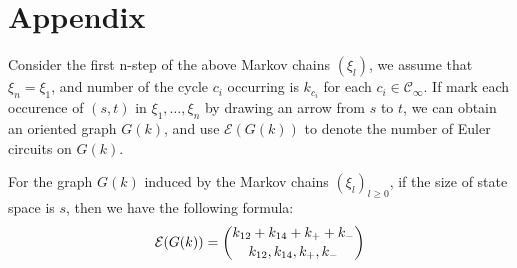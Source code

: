 \documentclass[11pt,en,cite=authoryear]{elegantpaper}
\begin{document}
\section{Appendix}
Consider the first n-step of the above Markov chains $(\xi_l)$, we assume that $\xi_{n}=\xi_1$, and number of the cycle $c_i$ occurring is $k_{c_i}$ for each $c_i \in \mathcal{C}_{\infty}$. 
If mark each occurence of $(s, t)$ in $\xi_1, \dots, \xi_n$ by drawing an arrow from $s$ to $t$, we can obtain an oriented graph $G(k)$, and use $\mathcal{E} (G(k))$ to denote the number of Euler circuits on $G(k)$.
\begin{theorem}
    For the graph $G(k)$ induced by the Markov chains $(\xi_l)_{l\ge 0}$, if the size of state space is $s$, then we have the following formula:
    \begin{equation*}
        \mathcal{E} (G(k)) = 
        \binom{k_{12}+k_{14}+k_{+}+k_{-}}{k_{12}, k_{14}, k_{+}, k_{-}} \\
        
    \end{equation*}
\end{theorem}
\end{document}
